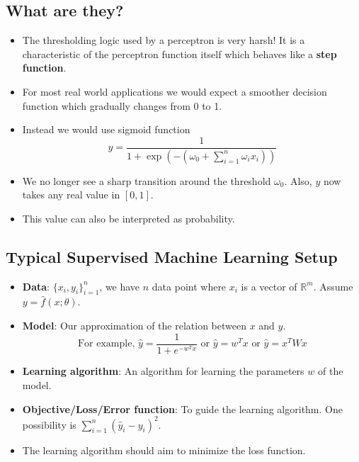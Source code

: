 \documentclass[a4paper]{article}
\begin{document}
\subsection{What are they?}
\begin{itemize}
    \item The thresholding logic used by a perceptron is very harsh! It is a characteristic of the perceptron function itself which behaves like a \textbf{step function}.
    \item For most real world applications we would expect a smoother decision function which gradually changes from 0 to 1.
    \item Instead we would use sigmoid function
    \begin{equation*}
        y=\frac{1}{1+\exp(-(\omega_0+\sum_{i=1}^n\omega_ix_i))}
    \end{equation*}
    \item We no longer see a sharp transition around the threshold $\omega_0$. Also, $y$ now takes any real value in $[0,1]$.
    \item This value can also be interpreted as probability.
\end{itemize}

\subsection{Typical Supervised Machine Learning Setup}\label{sec:DL-typical-ml-setup}
\begin{itemize}
    \item \textbf{Data}: $\{x_i,y_i\}_{i=1}^n$, we have $n$ data point where $x_i$ is a vector of $\mathbb{R}^m$. Assume $y=\hat{f}(x;\theta)$.
    \item \textbf{Model}: Our approximation of the relation between $x$ and $y$.
    \begin{equation*}
        \text{For example, }\hat{y}=\frac{1}{1+e^{-w^Tx}}\text{ or }\hat{y}=w^Tx\text{ or }\hat{y}=x^TWx
    \end{equation*}
    \item \textbf{Learning algorithm}: An algorithm for learning the parameters $w$ of the model.
    \item \textbf{Objective/Loss/Error function}: To guide the learning algorithm. One possibility is $\sum_{i=1}^n(\hat{y}_i-y_i)^2$.
    \item The learning algorithm should aim to minimize the loss function.
\end{itemize}
\end{document}
